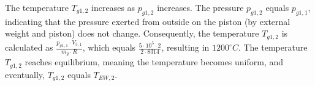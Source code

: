 The temperature \( T_{g1,2} \) increases as \( p_{g1,2} \) increases. The pressure \( p_{g1,2} \) equals \( p_{g1,1} \), indicating that the pressure exerted from outside on the piston (by external weight and piston) does not change. Consequently, the temperature \( T_{g1,2} \) is calculated as \( \frac{p_{g1,1} \cdot V_{3,1}}{m_g \cdot R} \), which equals \( \frac{5 \cdot 10^5 \cdot 2}{2 \cdot 8314} \), resulting in \( 1200^\circ C \). The temperature \( T_{g1,2} \) reaches equilibrium, meaning the temperature becomes uniform, and eventually, \( T_{g1,2} \) equals \( T_{EW,2} \).